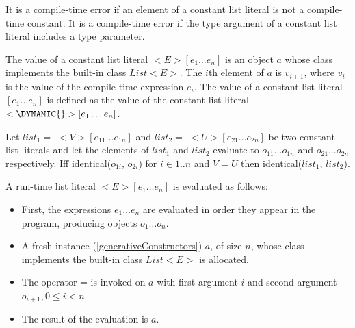 \documentclass{article}
\newcommand{\code}[1]{{\sf #1}}
\begin{document}
\LMHash{}
It is a compile-time error if an element of a constant list literal is not a compile-time constant. It is a compile-time error if the type argument of a constant list literal includes a type parameter.

\LMHash{}
The value of a constant list literal  \CONST{} $<E>[e_1\ldots e_n]$ is an object $a$ whose class implements the built-in class $List<E>$. The $i$th element of $a$ is $v_{i+1}$, where $v_i$ is the value of the compile-time expression $e_i$.  The value of a constant list literal  \CONST{} $[e_1 \ldots e_n]$ is defined as the value of the constant list literal \CONST{}$ < \DYNAMIC{}>[e_1\ldots e_n]$.

\LMHash{}
Let $list_1 =$ \CONST{} $<V>[e_{11} \ldots e_{1n}]$ and $list_2 =$  \CONST{} $<U>[e_{21} \ldots e_{2n}]$ be two constant list literals and let the  elements of $list_1$ and $list_2$  evaluate to  $o_{11} \ldots o_{1n}$ and $o_{21} \ldots o_{2n}$ respectively. Iff \code{identical($o_{1i}$, $o_{2i}$)} for $i \in 1.. n$ and $V = U$ then \code{identical($list_1$, $list_2$)}.


\LMHash{}
A run-time list literal $<E>[e_1 \ldots e_n]$  is evaluated as follows:
\begin{itemize}
\item
First, the expressions $e_1 \ldots e_n$ are evaluated in order they appear in the program, producing objects $o_1 \ldots o_n$.
\item A fresh instance (\ref{generativeConstructors}) $a$, of size $n$,  whose class implements the built-in class $List<E>$ is allocated.
\item
The operator \code{[]=} is invoked on $a$ with  first  argument $i$ and second argument
$o_{i+1}, 0 \le i < n$.
\item
The result of the evaluation is $a$.
\end{itemize}


\end{document}
